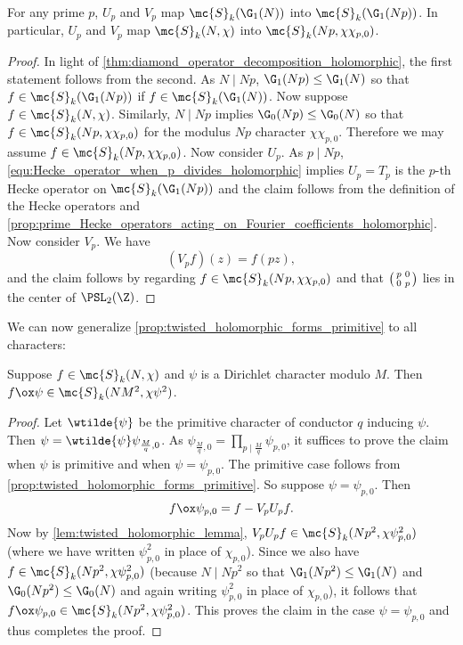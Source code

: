     \begin{lemma}\label{lem:twisted_holomorphic_lemma}
      For any prime $p$, $U_{p}$ and $V_{p}$ map $\mc{S}_{k}(\G_{1}(N))$ into $\mc{S}_{k}(\G_{1}(Np))$. In particular, $U_{p}$ and $V_{p}$ map $\mc{S}_{k}(N,\chi)$ into $\mc{S}_{k}(Np,\chi\chi_{p,0})$.
    \end{lemma}
    \begin{proof}
      In light of \cref{thm:diamond_operator_decomposition_holomorphic}, the first statement follows from the second. As $N \mid Np$, $\G_{1}(Np) \le \G_{1}(N)$ so that $f \in \mc{S}_{k}(\G_{1}(Np))$ if $f \in \mc{S}_{k}(\G_{1}(N))$. Now suppose $f \in \mc{S}_{k}(N,\chi)$. Similarly, $N \mid Np$ implies $\G_{0}(Np) \le \G_{0}(N)$ so that $f \in \mc{S}_{k}(Np,\chi\chi_{p,0})$ for the modulus $Np$ character $\chi\chi_{p,0}$. Therefore we may assume $f \in \mc{S}_{k}(Np,\chi\chi_{p,0})$. Now consider $U_{p}$. As $p \mid Np$, \cref{equ:Hecke_operator_when_p_divides_holomorphic} implies $U_{p} = T_{p}$ is the $p$-th Hecke operator on $\mc{S}_{k}(\G_{1}(Np))$ and the claim follows from the definition of the Hecke operators and \cref{prop:prime_Hecke_operators_acting_on_Fourier_coefficients_holomorphic}. Now consider $V_{p}$. We have
      \[
        (V_{p}f)(z) = f(pz),
      \]
      and the claim follows by regarding $f \in \mc{S}_{k}(Np,\chi\chi_{p,0})$ and that $\begin{psmallmatrix} p & 0 \\ 0 & p \end{psmallmatrix}$ lies in the center of $\PSL_{2}(\Z)$.
    \end{proof}

    We can now generalize \cref{prop:twisted_holomorphic_forms_primitive} to all characters:

    \begin{proposition}\label{prop:twisted_holomorphic_forms}
      Suppose $f \in \mc{S}_{k}(N,\chi)$ and $\psi$ is a Dirichlet character modulo $M$. Then $f \ox \psi \in \mc{S}_{k}(NM^{2},\chi\psi^{2})$.
    \end{proposition}
    \begin{proof}
      Let $\wtilde{\psi}$ be the primitive character of conductor $q$ inducing $\psi$. Then $\psi = \wtilde{\psi}\psi_{\frac{M}{q},0}$. As $\psi_{\frac{M}{q},0} = \prod_{p \mid \frac{M}{q}}\psi_{p,0}$, it suffices to prove the claim when $\psi$ is primitive and when $\psi = \psi_{p,0}$. The primitive case follows from \cref{prop:twisted_holomorphic_forms_primitive}. So suppose $\psi = \psi_{p,0}$. Then
      \[
        f \ox \psi_{p,0} = f-V_{p}U_{p}f.
      \]
      Now by \cref{lem:twisted_holomorphic_lemma}, $V_{p}U_{p}f \in \mc{S}_{k}(Np^{2},\chi\psi_{p,0}^{2})$ (where we have written $\psi_{p,0}^{2}$ in place of $\chi_{p,0}$). Since we also have $f \in \mc{S}_{k}(Np^{2},\chi\psi_{p,0}^{2})$ (because $N \mid Np^{2}$ so that $\G_{1}(Np^{2}) \le \G_{1}(N)$ and $\G_{0}(Np^{2}) \le \G_{0}(N)$ and again writing $\psi_{p,0}^{2}$ in place of $\chi_{p,0}$), it follows that $f \ox \psi_{p,0} \in \mc{S}_{k}(Np^{2},\chi\psi_{p,0}^{2})$. This proves the claim in the case $\psi = \psi_{p,0}$ and thus completes the proof.
    \end{proof}